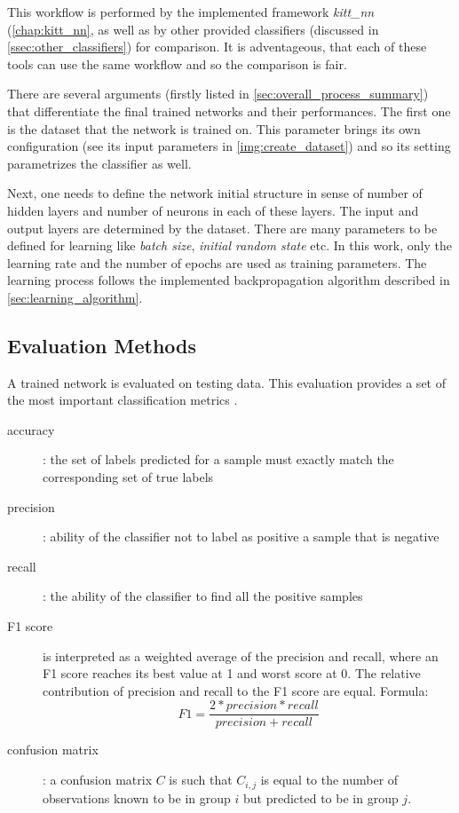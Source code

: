 This workflow is performed by the implemented framework \textit{kitt\_nn} (\cref{chap:kitt_nn}, as well as by other provided classifiers (discussed in \cref{ssec:other_classifiers}) for comparison. It is adventageous, that each of these tools can use the same workflow and so the comparison is fair.

There are several arguments (firstly listed in \cref{sec:overall_process_summary}) that differentiate the final trained networks and their performances. The first one is the dataset that the network is trained on. This parameter brings its own configuration (see its input parameters in \cref{img:create_dataset}) and so its setting parametrizes the classifier as well.

Next, one needs to define the network initial structure in sense of number of hidden layers and number of neurons in each of these layers. The input and output layers are determined by the dataset. There are many parameters to be defined for learning like \textit{batch size}, \textit{initial random state} etc. In this work, only the learning rate and the number of epochs are used as training parameters. The learning process follows the implemented backpropagation algorithm described in \cref{sec:learning_algorithm}.

\subsection{Evaluation Methods} \label{ssec:evaluation_methods}
A trained network is evaluated on testing data. This evaluation provides a set of the most important classification metrics \citep{article:scikit-learn}.

\begin{description}
\item[accuracy] : the set of labels predicted for a sample must exactly match the corresponding set of true labels
\item[precision] : ability of the classifier not to label as positive a sample that is negative
\item[recall] : the ability of the classifier to find all the positive samples
\item[F1 score] is interpreted as a weighted average of the precision and recall, where an F1 score reaches its best value at 1 and worst score at 0. The relative contribution of precision and recall to the F1 score are equal. Formula:
\begin{equation} \label{eq:f1_score}
F1 = \frac{2 * precision * recall}{precision + recall}
\end{equation}
\item[confusion matrix] : a confusion matrix $ C $ is such that $ C_{i, j} $ is equal to the number of observations known to be in group $ i $ but predicted to be in group $ j $.
\end{description}

